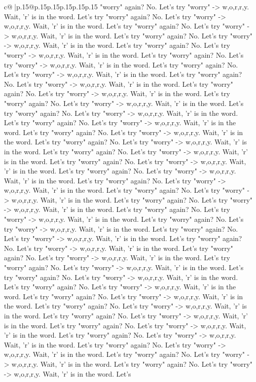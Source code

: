 \documentclass{article}
\begin{document}
{\begin{supertabular}{c@{$\;$}|p{.15\linewidth}@{}p{.15\linewidth}p{.15\linewidth}p{.15\linewidth}p{.15\linewidth}p{.15\linewidth}}
{{{"worry" again? No. Let's try "worry" {-}> w,o,r,r,y. Wait, 'r' is in the word. Let's try "worry" again? No. Let's try "worry" {-}> w,o,r,r,y. Wait, 'r' is in the word. Let's try "worry" again? No. Let's try "worry" {-}> w,o,r,r,y. Wait, 'r' is in the word. Let's try "worry" again? No. Let's try "worry" {-}> w,o,r,r,y. Wait, 'r' is in the word. Let's try "worry" again? No. Let's try "worry" {-}> w,o,r,r,y. Wait, 'r' is in the word. Let's try "worry" again? No. Let's try "worry" {-}> w,o,r,r,y. Wait, 'r' is in the word. Let's try "worry" again? No. Let's try "worry" {-}> w,o,r,r,y. Wait, 'r' is in the word. Let's try "worry" again? No. Let's try "worry" {-}> w,o,r,r,y. Wait, 'r' is in the word. Let's try "worry" again? No. Let's try "worry" {-}> w,o,r,r,y. Wait, 'r' is in the word. Let's try "worry" again? No. Let's try "worry" {-}> w,o,r,r,y. Wait, 'r' is in the word. Let's try "worry" again? No. Let's try "worry" {-}> w,o,r,r,y. Wait, 'r' is in the word. Let's try "worry" again? No. Let's try "worry" {-}> w,o,r,r,y. Wait, 'r' is in the word. Let's try "worry" again? No. Let's try "worry" {-}> w,o,r,r,y. Wait, 'r' is in the word. Let's try "worry" again? No. Let's try "worry" {-}> w,o,r,r,y. Wait, 'r' is in the word. Let's try "worry" again? No. Let's try "worry" {-}> w,o,r,r,y. Wait, 'r' is in the word. Let's try "worry" again? No. Let's try "worry" {-}> w,o,r,r,y. Wait, 'r' is in the word. Let's try "worry" again? No. Let's try "worry" {-}> w,o,r,r,y. Wait, 'r' is in the word. Let's try "worry" again? No. Let's try "worry" {-}> w,o,r,r,y. Wait, 'r' is in the word. Let's try "worry" again? No. Let's try "worry" {-}> w,o,r,r,y. Wait, 'r' is in the word. Let's try "worry" again? No. Let's try "worry" {-}> w,o,r,r,y. Wait, 'r' is in the word. Let's try "worry" again? No. Let's try "worry" {-}> w,o,r,r,y. Wait, 'r' is in the word. Let's try "worry" again? No. Let's try "worry" {-}> w,o,r,r,y. Wait, 'r' is in the word. Let's try "worry" again? No. Let's try "worry" {-}> w,o,r,r,y. Wait, 'r' is in the word. Let's try "worry" again? No. Let's try "worry" {-}> w,o,r,r,y. Wait, 'r' is in the word. Let's try "worry" again? No. Let's try "worry" {-}> w,o,r,r,y. Wait, 'r' is in the word. Let's try "worry" again? No. Let's try "worry" {-}> w,o,r,r,y. Wait, 'r' is in the word. Let's try "worry" again? No. Let's try "worry" {-}> w,o,r,r,y. Wait, 'r' is in the word. Let's try "worry" again? No. Let's try "worry" {-}> w,o,r,r,y. Wait, 'r' is in the word. Let's try "worry" again? No. Let's try "worry" {-}> w,o,r,r,y. Wait, 'r' is in the word. Let's try "worry" again? No. Let's try "worry" {-}> w,o,r,r,y. Wait, 'r' is in the word. Let's try "worry" again? No. Let's try "worry" {-}> w,o,r,r,y. Wait, 'r' is in the word. Let's try "worry" again? No. Let's try "worry" {-}> w,o,r,r,y. Wait, 'r' is in the word. Let's try "worry" again? No. Let's try "worry" {-}> w,o,r,r,y. Wait, 'r' is in the word. Let's try "worry" again? No. Let's try "worry" {-}> w,o,r,r,y. Wait, 'r' is in the word. Let's try "worry" again? No. Let's try "worry" {-}> w,o,r,r,y. Wait, 'r' is in the word. Let's try "worry" again? No. Let's try "worry" {-}> w,o,r,r,y. Wait, 'r' is in the word. Let's }}}
\end{supertabular}}
\end{document}
